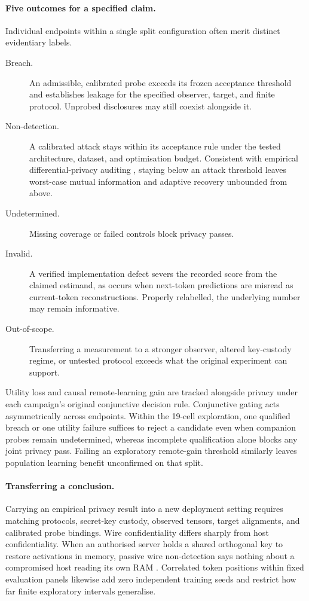 \paragraph{Five outcomes for a specified claim.}
Individual endpoints within a single split configuration often merit
distinct evidentiary labels.
\begin{description}
  \item[Breach.] An admissible, calibrated probe exceeds its frozen
    acceptance threshold and establishes leakage for the specified observer,
    target, and finite protocol. Unprobed disclosures may still coexist
    alongside it.
  \item[Non-detection.] A calibrated attack stays within its acceptance rule
    under the tested architecture, dataset, and optimisation budget.
    Consistent with empirical differential-privacy auditing
    \cite{jagielski2020}, staying below an attack threshold leaves
    worst-case mutual information and adaptive recovery unbounded from above.
  \item[Undetermined.] Missing coverage or failed controls block privacy
    passes.
  \item[Invalid.] A verified implementation defect severs the recorded score
    from the claimed estimand, as occurs when next-token predictions are
    misread as current-token reconstructions. Properly relabelled, the
    underlying number may remain informative.
  \item[Out-of-scope.] Transferring a measurement to a stronger observer,
    altered key-custody regime, or untested protocol exceeds what the
    original experiment can support.
\end{description}

Utility loss and causal remote-learning gain are tracked alongside privacy
under each campaign's original conjunctive decision rule. Conjunctive gating
acts asymmetrically across endpoints. Within the 19-cell exploration, one
qualified breach or one utility failure suffices to reject a candidate even
when companion probes remain undetermined, whereas incomplete qualification
alone blocks any joint privacy pass. Failing an exploratory remote-gain
threshold similarly leaves population learning benefit unconfirmed on that
split.

\paragraph{Transferring a conclusion.}
Carrying an empirical privacy result into a new deployment setting requires
matching protocols, secret-key custody, observed tensors, target alignments,
and calibrated probe bindings. Wire confidentiality differs sharply from
host confidentiality. When an authorised server holds a shared orthogonal
key to restore activations in memory, passive wire non-detection says
nothing about a compromised host reading its own RAM \cite{permattack2025}.
Correlated token positions within fixed evaluation panels likewise add zero
independent training seeds and restrict how far finite exploratory
intervals generalise.

